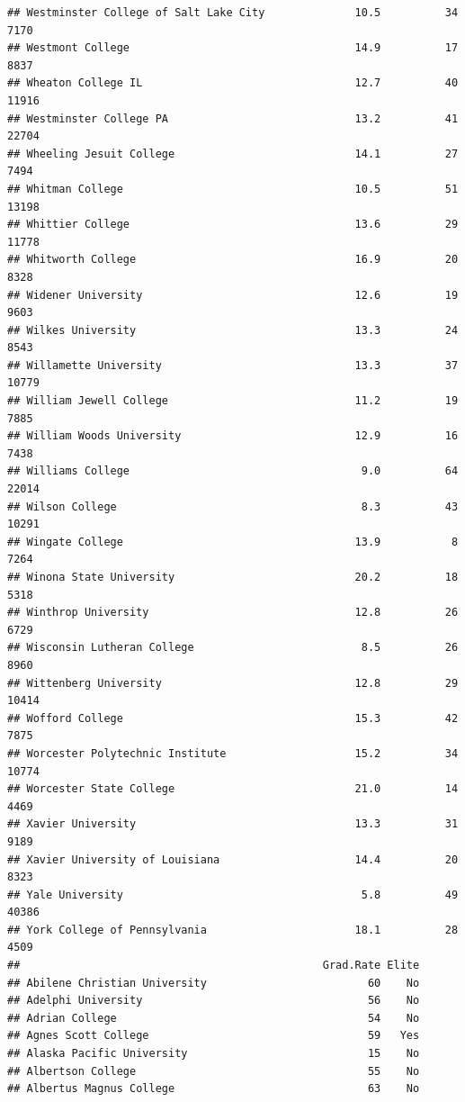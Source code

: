 \documentclass[
]{article}
\begin{document}
\begin{verbatim}
## Westminster College of Salt Lake City              10.5          34   7170
## Westmont College                                   14.9          17   8837
## Wheaton College IL                                 12.7          40  11916
## Westminster College PA                             13.2          41  22704
## Wheeling Jesuit College                            14.1          27   7494
## Whitman College                                    10.5          51  13198
## Whittier College                                   13.6          29  11778
## Whitworth College                                  16.9          20   8328
## Widener University                                 12.6          19   9603
## Wilkes University                                  13.3          24   8543
## Willamette University                              13.3          37  10779
## William Jewell College                             11.2          19   7885
## William Woods University                           12.9          16   7438
## Williams College                                    9.0          64  22014
## Wilson College                                      8.3          43  10291
## Wingate College                                    13.9           8   7264
## Winona State University                            20.2          18   5318
## Winthrop University                                12.8          26   6729
## Wisconsin Lutheran College                          8.5          26   8960
## Wittenberg University                              12.8          29  10414
## Wofford College                                    15.3          42   7875
## Worcester Polytechnic Institute                    15.2          34  10774
## Worcester State College                            21.0          14   4469
## Xavier University                                  13.3          31   9189
## Xavier University of Louisiana                     14.4          20   8323
## Yale University                                     5.8          49  40386
## York College of Pennsylvania                       18.1          28   4509
##                                               Grad.Rate Elite
## Abilene Christian University                         60    No
## Adelphi University                                   56    No
## Adrian College                                       54    No
## Agnes Scott College                                  59   Yes
## Alaska Pacific University                            15    No
## Albertson College                                    55    No
## Albertus Magnus College                              63    No

\end{verbatim}
\end{document}
